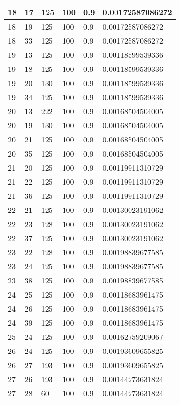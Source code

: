 \begin{longtable}{|l|l|l|l|l|l|}
18 & 17 & 125 & 100 & 0.9 & 0.00172587086272 \\ \hline
18 & 19 & 125 & 100 & 0.9 & 0.00172587086272 \\ \hline
18 & 33 & 125 & 100 & 0.9 & 0.00172587086272 \\ \hline
19 & 13 & 125 & 100 & 0.9 & 0.00118599539336 \\ \hline
19 & 18 & 125 & 100 & 0.9 & 0.00118599539336 \\ \hline
19 & 20 & 130 & 100 & 0.9 & 0.00118599539336 \\ \hline
19 & 34 & 125 & 100 & 0.9 & 0.00118599539336 \\ \hline
20 & 13 & 222 & 100 & 0.9 & 0.00168504504005 \\ \hline
20 & 19 & 130 & 100 & 0.9 & 0.00168504504005 \\ \hline
20 & 21 & 125 & 100 & 0.9 & 0.00168504504005 \\ \hline
20 & 35 & 125 & 100 & 0.9 & 0.00168504504005 \\ \hline
21 & 20 & 125 & 100 & 0.9 & 0.00119911310729 \\ \hline
21 & 22 & 125 & 100 & 0.9 & 0.00119911310729 \\ \hline
21 & 36 & 125 & 100 & 0.9 & 0.00119911310729 \\ \hline
22 & 21 & 125 & 100 & 0.9 & 0.00130023191062 \\ \hline
22 & 23 & 128 & 100 & 0.9 & 0.00130023191062 \\ \hline
22 & 37 & 125 & 100 & 0.9 & 0.00130023191062 \\ \hline
23 & 22 & 128 & 100 & 0.9 & 0.00198839677585 \\ \hline
23 & 24 & 125 & 100 & 0.9 & 0.00198839677585 \\ \hline
23 & 38 & 125 & 100 & 0.9 & 0.00198839677585 \\ \hline
24 & 25 & 125 & 100 & 0.9 & 0.00118683961475 \\ \hline
24 & 26 & 125 & 100 & 0.9 & 0.00118683961475 \\ \hline
24 & 39 & 125 & 100 & 0.9 & 0.00118683961475 \\ \hline
25 & 24 & 125 & 100 & 0.9 & 0.00162759209067 \\ \hline
26 & 24 & 125 & 100 & 0.9 & 0.00193609655825 \\ \hline
26 & 27 & 193 & 100 & 0.9 & 0.00193609655825 \\ \hline
27 & 26 & 193 & 100 & 0.9 & 0.00144273631824 \\ \hline
27 & 28 & 60  & 100 & 0.9 & 0.00144273631824 \\ \hline

\end{longtable}

